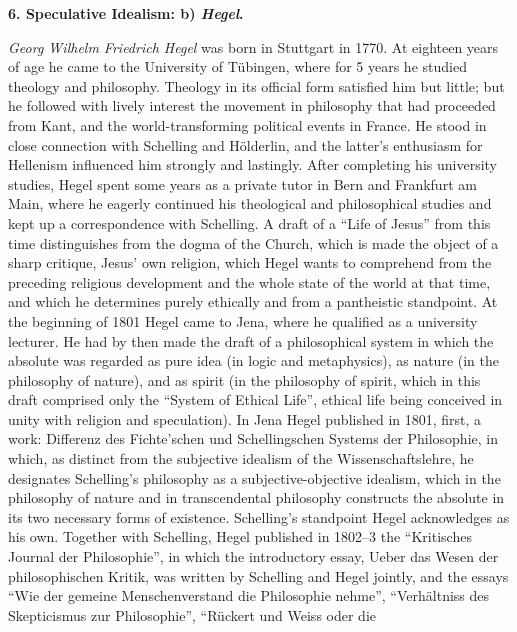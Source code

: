 \divrule

\begin{center}
  \textbf{6. Speculative Idealism: b) \emph{Hegel}.}
\end{center}

\emph{Georg Wilhelm Friedrich Hegel} was born in Stuttgart in 1770.
At eighteen years of age he came to the University of Tübingen, where
for 5 years he studied theology and philosophy. Theology in
its official form satisfied him but little; but he followed with lively
interest the movement in philosophy that had proceeded from Kant, and
the world-transforming political events in France. He stood in close
connection with Schelling and Hölderlin, and the latter's enthusiasm for
Hellenism influenced him strongly and lastingly. After completing his
university studies, Hegel spent some years as a private tutor in Bern
and Frankfurt am Main, where he eagerly continued his theological and
philosophical studies and kept up a correspondence with Schelling. A
draft of a ``Life of Jesus'' from this time distinguishes from the
dogma of the Church, which is made the object of a sharp critique,
Jesus' own religion, which Hegel wants to comprehend from the preceding
religious development and the whole state of the world at that time,
and which he determines purely ethically and from a pantheistic
standpoint. At the beginning of 1801 Hegel came to Jena, where he
qualified as a university lecturer. He had by then made the draft of a
philosophical system in which the absolute was regarded as pure idea
(in logic and metaphysics), as nature (in the philosophy of nature), and
as spirit (in the philosophy of spirit, which in this draft comprised
only the ``System of Ethical Life'', ethical life being conceived in
unity with religion and speculation). In Jena Hegel published in 1801,
first, a work: Differenz des Fichte'schen und Schellingschen Systems
der Philosophie, in which, as distinct from the subjective idealism of
the Wissenschaftslehre, he designates Schelling's philosophy as a
subjective-objective idealism, which in the philosophy of nature and in
transcendental philosophy constructs the absolute in its two necessary
forms of existence. Schelling's standpoint Hegel acknowledges as his
own. Together with Schelling, Hegel published in 1802--3 the
``Kritisches Journal der Philosophie'', in which the introductory
essay, Ueber das Wesen der philosophischen Kritik, was written by
Schelling and Hegel jointly, and the essays ``Wie der gemeine
Menschenverstand die Philosophie nehme'', ``Verhältniss des
Skepticismus zur Philosophie'', ``Rückert und Weiss oder die
